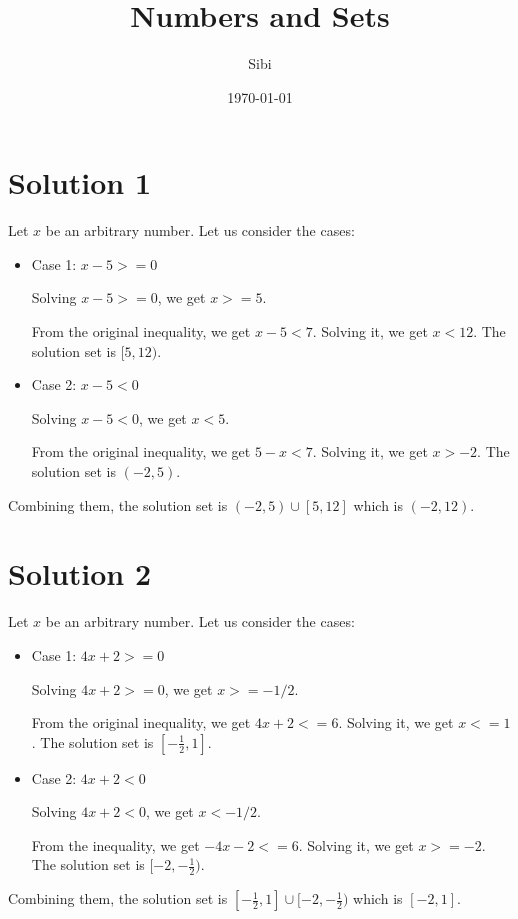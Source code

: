 \documentclass{article}
\begin{document}
\title{Numbers and Sets}
\author{Sibi}
\date{\today}
\maketitle

\DeclarePairedDelimiter\abs{\lvert}{\rvert}%
\DeclarePairedDelimiter\norm{\lVert}{\rVert}%

\makeatletter
\let\oldabs\abs
\def\abs{\@ifstar{\oldabs}{\oldabs*}}
% 
\let\oldnorm\norm
\def\norm{\@ifstar{\oldnorm}{\oldnorm*}}
\makeatother
\newpage

\section{Solution 1}

Let $x$ be an arbitrary number. Let us consider the cases:

\begin{itemize}
\item Case 1: $x - 5 >= 0$

  Solving $x - 5 >= 0$, we get $x >= 5$.
  
  From the original inequality, we get $x - 5 < 7$. Solving it, we get
  $x < 12$. The solution set is $[5, 12)$.
  
\item Case 2: $x - 5 < 0$

  Solving $x - 5 < 0$, we get $x < 5$.

  From the original inequality, we get $5 - x< 7$. Solving it, we get $x >
  -2$. The solution set is $(-2, 5)$.
\end{itemize}

Combining them, the solution set is $(-2, 5) \cup [5,12]$ which is
$(-2, 12)$.

\section{Solution 2}

Let $x$ be an arbitrary number. Let us consider the cases:

\begin{itemize}
\item Case 1: $4x + 2 >= 0$

  Solving $4x + 2 >= 0$, we get $ x >= -1/2$.
  
  From the original inequality, we get $4x + 2 <= 6$. Solving it, we get
  $x <= 1$. The solution set is $[-\frac{1}{2}, 1]$.
  
\item Case 2: $4x + 2 < 0$

  Solving $4x + 2 < 0$, we get $x < -1/2$.

  From the inequality, we get $-4x - 2 <= 6$. Solving it, we get
  $x >= -2$. The solution set is $[-2, -\frac{1}{2})$.
\end{itemize}

Combining them, the solution set is
$[-\frac{1}{2}, 1] \cup [-2, -\frac{1}{2})$ which is $[-2, 1]$.
\end{document}
